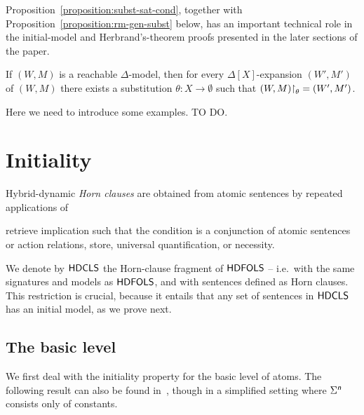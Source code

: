 \documentclass[a4paper,UKenglish,cleveref,autoref]{lipics-v2019}
\begin{document}
Proposition~\ref{proposition:subst-sat-cond}, together with Proposition~\ref{proposition:rm-gen-subst} below, has an important technical role in the initial-model and Herbrand's-theorem proofs presented in the later sections of the paper.

\begin{proposition} 
  \label{proposition:rm-gen-subst}
  If $(W, M)$ is a reachable $\Delta$-model, then for every $\Delta[X]$-expansion $(W', M')$ of $(W, M)$ there exists a substitution $\theta \colon X \to \emptyset$ such that $(W, M) \mathord{\upharpoonright}_{\theta} = (W', M')$.
  \pushQED{\qed}\qedhere
\end{proposition}

Here we need to introduce some examples. TO DO.



\section{Initiality}
\label{section:initiality}

Hybrid-dynamic \emph{Horn clauses} are obtained from atomic sentences by repeated applications of%
\begin{inparenum}
  \inparitem retrieve
  \inparitem implication such that the condition is a conjunction of atomic sentences or action relations, 
  \inparitem store,
  \inparitem universal quantification, or
  \inparitem necessity.
\end{inparenum}
We denote by ${\mathsf{HDCLS}}$ the Horn-clause fragment of ${\mathsf{HDFOLS}}$ -- i.e.\ with the same signatures and models as ${\mathsf{HDFOLS}}$, and with sentences defined as Horn clauses.
This restriction is crucial, because it entails that any set of sentences in ${\mathsf{HDCLS}}$ has an initial model, as we prove next.


\subsection{The basic level}
\label{subsection:basic-level}

We first deal with the initiality property for the basic level of atoms.
The following result can also be found in~\cite{Gaina17Her}, though in a simplified setting where $\Sigma^{\text{\normalfont\sffamily\itshape n}}$ consists only of constants.
\end{document}
